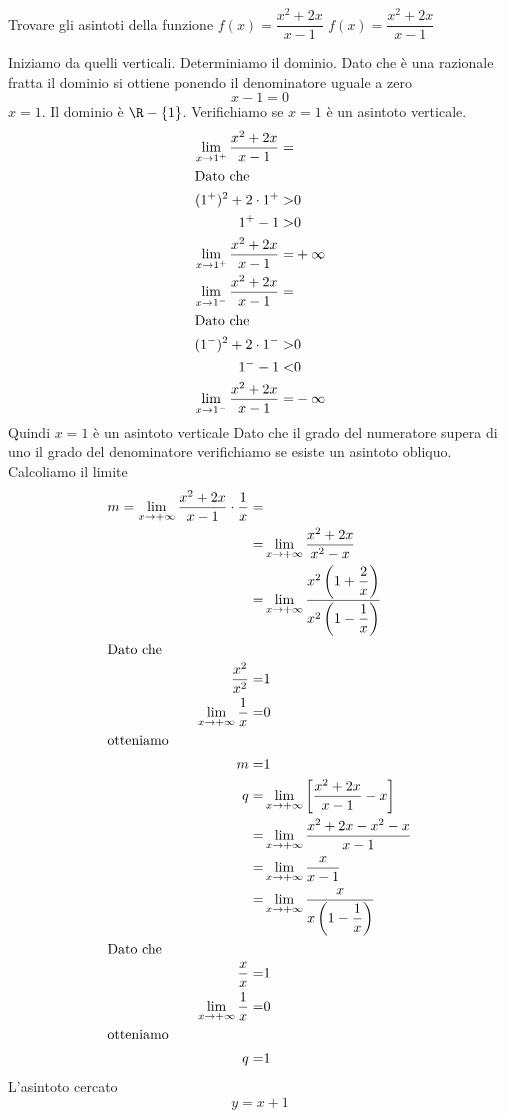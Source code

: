 \begin{exercise}
	Trovare gli asintoti della funzione $f(x)=\dfrac{x^2+2x}{x-1}$
	\tcblower
	$f(x)=\dfrac{x^2+2x}{x-1}$
		
Iniziamo da quelli verticali. Determiniamo il dominio. Dato che è una razionale fratta il dominio si ottiene ponendo il denominatore uguale a zero\[x-1=0\] $x=1$. Il dominio è $\R-\lbrace1\rbrace$. Verifichiamo se $x=1$ è un asintoto verticale.
\begin{align*}
\lim_{x\to 1^+}\dfrac{x^2+2x}{x-1}=&\\
\intertext{Dato che}
(1^+)^2+2\cdot 1^+>&0\\
1^+-1>&0\\
\lim_{x\to 1^+}\dfrac{x^2+2x}{x-1}=&+\infty\\
\lim_{x\to 1^-}\dfrac{x^2+2x}{x-1}=&\\
\intertext{Dato che}
(1^-)^2+2\cdot 1^->&0\\
1^--1<&0\\
\lim_{x\to 1^-}\dfrac{x^2+2x}{x-1}=&-\infty\\
\end{align*}
Quindi $x=1$ è un asintoto verticale
Dato che il grado del numeratore supera di uno il grado del denominatore verifichiamo se esiste un asintoto obliquo. Calcoliamo il limite
\begin{align*}
m=\lim_{x\to +\infty}\dfrac{x^2+2x}{x-1}\cdot\dfrac{1}{x}=&\\
=&\lim_{x\to +\infty}\dfrac{x^2+2x}{x^2-x}\\
=&\lim_{x\to +\infty}\dfrac{x^2\left(1+\dfrac{2}{x}\right)}{x^2\left(1-\dfrac{1}{x}\right)}\\
\intertext{Dato che}
\dfrac{x^2}{x^2}=&1\\
\lim_{x\to +\infty}\dfrac{1}{x}=&0\\
\intertext{otteniamo}
m=&1\\
q=&\lim_{x\to +\infty}\left[\dfrac{x^2+2x}{x-1}-x\right]\\
=&\lim_{x\to +\infty}\dfrac{x^2+2x-x^2-x}{x-1}\\
=&\lim_{x\to +\infty}\dfrac{x}{x-1}\\
=&\lim_{x\to +\infty}\dfrac{x}{x\left(1-\dfrac{1}{x}\right)}\\
\intertext{Dato che}
\dfrac{x}{x}=&1\\
\lim_{x\to +\infty}\dfrac{1}{x}=&0\\
\intertext{otteniamo}
q=&1\\
\end{align*}
L'asintoto cercato\[y=x+1\]
\end{exercise}
